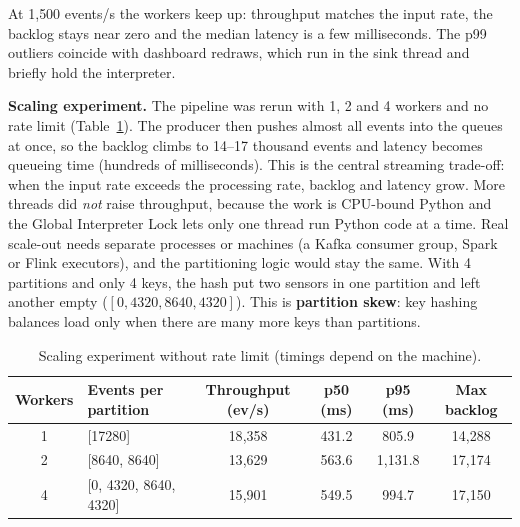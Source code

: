 \documentclass[11pt]{article}
\begin{document}
At 1{,}500 events/s the workers keep up: throughput matches the input rate, the backlog stays near zero and the median latency is a few milliseconds. The p99 outliers coincide with dashboard redraws, which run in the sink thread and briefly hold the interpreter.

\textbf{Scaling experiment.} The pipeline was rerun with 1, 2 and 4 workers and no rate limit (Table~\ref{tab:scaling}). The producer then pushes almost all events into the queues at once, so the backlog climbs to 14--17 thousand events and latency becomes queueing time (hundreds of milliseconds). This is the central streaming trade-off: when the input rate exceeds the processing rate, backlog and latency grow. More threads did \emph{not} raise throughput, because the work is CPU-bound Python and the Global Interpreter Lock lets only one thread run Python code at a time. Real scale-out needs separate processes or machines (a Kafka consumer group, Spark or Flink executors), and the partitioning logic would stay the same. With 4 partitions and only 4 keys, the hash put two sensors in one partition and left another empty ($[0, 4320, 8640, 4320]$). This is \textbf{partition skew}: key hashing balances load only when there are many more keys than partitions.

\begin{table}[H]
\centering\small
\begin{tabular}{@{}clcccc@{}}
\toprule
Workers & Events per partition & Throughput (ev/s) & p50 (ms) & p95 (ms) & Max backlog \\
\midrule
1 & [17280] & 18{,}358 & 431.2 & 805.9 & 14{,}288 \\
2 & [8640, 8640] & 13{,}629 & 563.6 & 1{,}131.8 & 17{,}174 \\
4 & [0, 4320, 8640, 4320] & 15{,}901 & 549.5 & 994.7 & 17{,}150 \\
\bottomrule
\end{tabular}
\caption{Scaling experiment without rate limit (timings depend on the machine).}
\label{tab:scaling}
\end{table}
\end{document}
